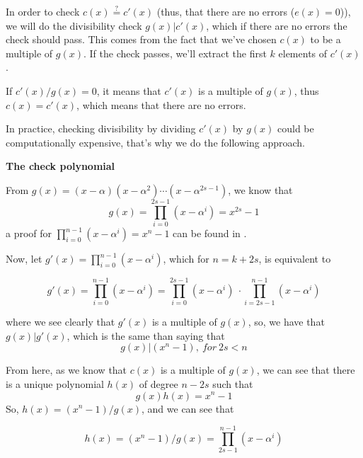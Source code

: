 \documentclass[a4paper]{article}
\theoremstyle{definition}
\begin{document}
In order to check $c(x)\stackrel{?}{=} c'(x)$ (thus, that there are no errors ($e(x) = 0$)), we will do the divisibility check $g(x) | c'(x)$, which if there are no errors the check should pass. This comes from the fact that we've chosen $c(x)$ to be a multiple of $g(x)$.
If the check passes, we'll extract the first $k$ elements of $c'(x)$.

If $c'(x) / g(x) = 0$, it means that $c'(x)$ is a multiple of $g(x)$, thus $c(x)=c'(x)$, which means that there are no errors.

In practice, checking divisibility by dividing $c'(x)$ by $g(x)$ could be computationally expensive, that's why we do the following approach.
% 
% 

\textbf{The check polynomial}

From $g(x) = (x-\alpha) (x-\alpha^2) \cdots (x-\alpha^{2s-1})$, we know that
$$g(x) = \prod_{i=0}^{2s-1} (x - \alpha^i) = x^{2s} - 1$$
a proof for $\prod_{i=0}^{n-1} (x - \alpha^i) = x^n - 1$ can be found in \cite{cyclotomicpolyroots}.

Now, let $g'(x)=\prod_{i=0}^{n-1} (x-\alpha^i)$, which for $n=k +2s$, is equivalent to

$$g'(x) = \prod_{i=0}^{n-1} (x-\alpha^i) = \prod_{i=0}^{2s-1} (x-\alpha^i) ~\cdot \prod_{i=2s-1}^{n-1} (x-\alpha^i)$$

where we see clearly that $g'(x)$ is a multiple of $g(x)$, so, we have that $g(x) | g'(x)$, which is the same than saying that
$$g(x) | (x^n-1),~for~2s<n$$

From here, as we know that $c(x)$ is a multiple of $g(x)$, we can see that there is a unique polynomial $h(x)$ of degree $n-2s$ such that
$$g(x) h(x) = x^n - 1$$
So, $h(x) = (x^n -1) / g(x)$, and we can see that

$$h(x) = (x^n -1)/g(x)= \prod_{2s-1}^{n-1} (x - \alpha^i)$$
\end{document}
